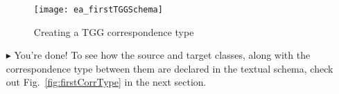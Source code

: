 \begin{itemize}
\vspace{0.5cm}

\begin{figure}[htbp]
\begin{center}
  \texttt{[image: ea\_firstTGGSchema]}
  \caption{Creating a TGG correspondence type} 
  \label{fig:ea_firstCorrType}
\end{center}
\end{figure}

\item[$\blacktriangleright$] You're done! To see how the source and target classes, along with the correspondence type between them are declared in the textual
schema, check out Fig.~\ref{fig:firstCorrType} in the next section.



\end{itemize}

